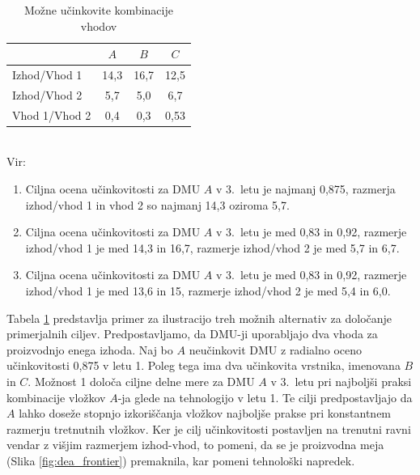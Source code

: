 \documentclass[12pt,a4paper]{article}
\theoremstyle{definition}
\begin{document}
\begin{table}[H]
    \centering
    \caption{Možne učinkovite kombinacije vhodov}
    \label{table:dmu_primer}
    \begin{tabular}{|l|c|c|c|}
    \hline
    & $A$ & $B$ & $C$ \\
    \hline
    Izhod/Vhod 1 & 14,3 & 16,7 & 12,5 \\
    Izhod/Vhod 2 & 5,7 & 5,0 & 6,7 \\
    Vhod 1/Vhod 2 & 0,4 & 0,3 & 0,53 \\
    \hline
    \end{tabular}
    \\ \vspace{0.2em}
    \footnotesize{Vir: \cite{Yaisawarng2002}}
\end{table}
    
\begin{enumerate}
    \item[Možnost 1:] Ciljna ocena učinkovitosti za 
    DMU $A$ v 3.\ letu je najmanj 0{,}875, razmerja 
    izhod/vhod 1 in vhod 2 so najmanj 14,3 oziroma 5,7.
    
    \item[Možnost 2:] Ciljna ocena učinkovitosti za DMU
    $A$ v 3.\ letu je med 0{,}83 in 0{,}92, razmerje 
    izhod/vhod 1 je med 14,3 in 16,7, razmerje izhod/vhod 
    2 je med 5{,}7 in 6{,}7.
    
    \item[Možnost 3:] Ciljna ocena učinkovitosti za DMU
    $A$ v 3.\ letu je med 0{,}83 in 0{,}92, razmerje 
    izhod/vhod 1 je med 13{,}6 in 15, razmerje 
    izhod/vhod 2 je med 5{,}4 in 6{,}0.
\end{enumerate}

Tabela \ref{table:dmu_primer} predstavlja primer za ilustracijo
treh možnih alternativ za določanje primerjalnih
ciljev. Predpostavljamo, da DMU-ji uporabljajo dva
vhoda za proizvodnjo enega izhoda. Naj bo $A$ neučinkovit
DMU z radialno oceno učinkovitosti 0{,}875 v letu 1.
Poleg tega ima dva učinkovita vrstnika, imenovana 
$B$ in $C$. Možnost 1 določa ciljne delne mere za DMU
$A$ v 3.\ letu pri najboljši praksi kombinacije vložkov
$A$-ja glede na tehnologijo v letu 1. Te cilji 
predpostavljajo da $A$ lahko doseže stopnjo
izkoriščanja vložkov najboljše prakse pri konstantnem
razmerju tretnutnih vložkov. Ker je cilj učinkovitosti
postavljen na trenutni ravni vendar z višjim razmerjem
izhod-vhod, to pomeni, da se je proizvodna meja (Slika
\ref{fig:dea_frontier}) premaknila, kar pomeni tehnološki
napredek. \cite{Yaisawarng2002}
\end{document}
